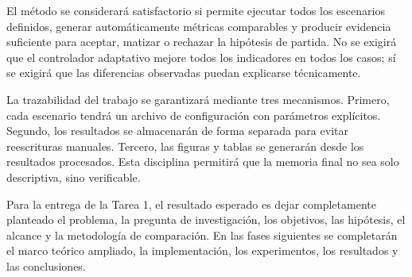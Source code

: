 \documentclass[12pt,a4paper]{article}
\begin{document}
El método se considerará satisfactorio si permite ejecutar todos los escenarios definidos, generar automáticamente métricas comparables y producir evidencia suficiente para aceptar, matizar o rechazar la hipótesis de partida. No se exigirá que el controlador adaptativo mejore todos los indicadores en todos los casos; sí se exigirá que las diferencias observadas puedan explicarse técnicamente.

La trazabilidad del trabajo se garantizará mediante tres mecanismos. Primero, cada escenario tendrá un archivo de configuración con parámetros explícitos. Segundo, los resultados se almacenarán de forma separada para evitar reescrituras manuales. Tercero, las figuras y tablas se generarán desde los resultados procesados. Esta disciplina permitirá que la memoria final no sea solo descriptiva, sino verificable.

Para la entrega de la Tarea 1, el resultado esperado es dejar completamente planteado el problema, la pregunta de investigación, los objetivos, las hipótesis, el alcance y la metodología de comparación. En las fases siguientes se completarán el marco teórico ampliado, la implementación, los experimentos, los resultados y las conclusiones.
\end{document}
